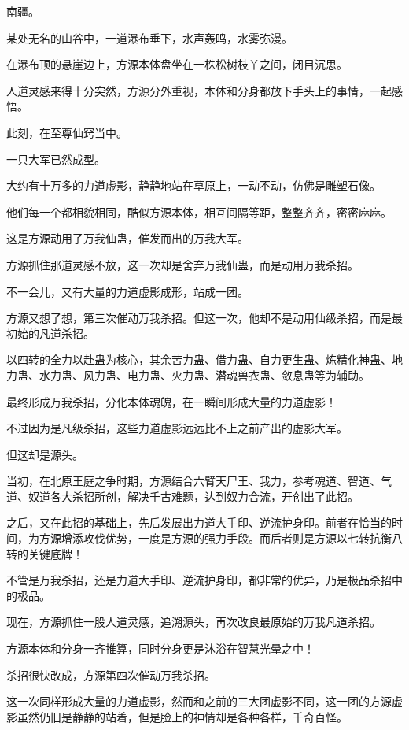 
\begin{this_body}

南疆。

某处无名的山谷中，一道瀑布垂下，水声轰鸣，水雾弥漫。

在瀑布顶的悬崖边上，方源本体盘坐在一株松树枝丫之间，闭目沉思。

人道灵感来得十分突然，方源分外重视，本体和分身都放下手头上的事情，一起感悟。

此刻，在至尊仙窍当中。

一只大军已然成型。

大约有十万多的力道虚影，静静地站在草原上，一动不动，仿佛是雕塑石像。

他们每一个都相貌相同，酷似方源本体，相互间隔等距，整整齐齐，密密麻麻。

这是方源动用了万我仙蛊，催发而出的万我大军。

方源抓住那道灵感不放，这一次却是舍弃万我仙蛊，而是动用万我杀招。

不一会儿，又有大量的力道虚影成形，站成一团。

方源又想了想，第三次催动万我杀招。但这一次，他却不是动用仙级杀招，而是最初始的凡道杀招。

以四转的全力以赴蛊为核心，其余苦力蛊、借力蛊、自力更生蛊、炼精化神蛊、地力蛊、水力蛊、风力蛊、电力蛊、火力蛊、潜魂兽衣蛊、敛息蛊等为辅助。

最终形成万我杀招，分化本体魂魄，在一瞬间形成大量的力道虚影！

不过因为是凡级杀招，这些力道虚影远远比不上之前产出的虚影大军。

但这却是源头。

当初，在北原王庭之争时期，方源结合六臂天尸王、我力，参考魂道、智道、气道、奴道各大杀招所创，解决千古难题，达到奴力合流，开创出了此招。

之后，又在此招的基础上，先后发展出力道大手印、逆流护身印。前者在恰当的时间，为方源增添攻伐优势，一度是方源的强力手段。而后者则是方源以七转抗衡八转的关键底牌！

不管是万我杀招，还是力道大手印、逆流护身印，都非常的优异，乃是极品杀招中的极品。

现在，方源抓住一股人道灵感，追溯源头，再次改良最原始的万我凡道杀招。

方源本体和分身一齐推算，同时分身更是沐浴在智慧光晕之中！

杀招很快改成，方源第四次催动万我杀招。

这一次同样形成大量的力道虚影，然而和之前的三大团虚影不同，这一团的方源虚影虽然仍旧是静静的站着，但是脸上的神情却是各种各样，千奇百怪。


\end{this_body}
